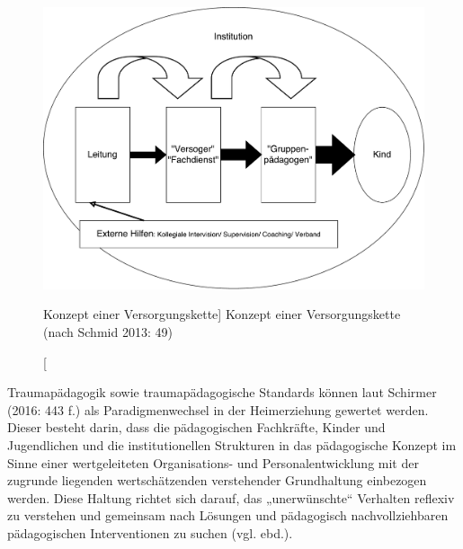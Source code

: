\begin{figure}[h]
  \centering
  \includegraphics[scale=0.3]{abbildung3}
  \caption
      [Konzept einer Versorgungskette]
      {Konzept einer Versorgungskette (nach Schmid 2013: 49)}
  \label{fig:konzept}
\end{figure}

Traumap{\"a}dagogik sowie traumapädagogische Standards können laut Schirmer (2016: 443 f.) als Paradigmenwechsel in der Heimerziehung gewertet werden. Dieser besteht darin, dass die pädagogischen Fachkräfte, Kinder und Jugendlichen und die institutionellen Strukturen in das pädagogische Konzept im Sinne einer wertgeleiteten Organisations- und Personalentwicklung mit der zugrunde liegenden wertschätzenden verstehender Grundhaltung einbezogen werden. Diese Haltung richtet sich darauf, das „unerwünschte“ Verhalten reflexiv zu verstehen und gemeinsam nach Lösungen und pädagogisch nachvollziehbaren pädagogischen Interventionen zu suchen (vgl. ebd.).

